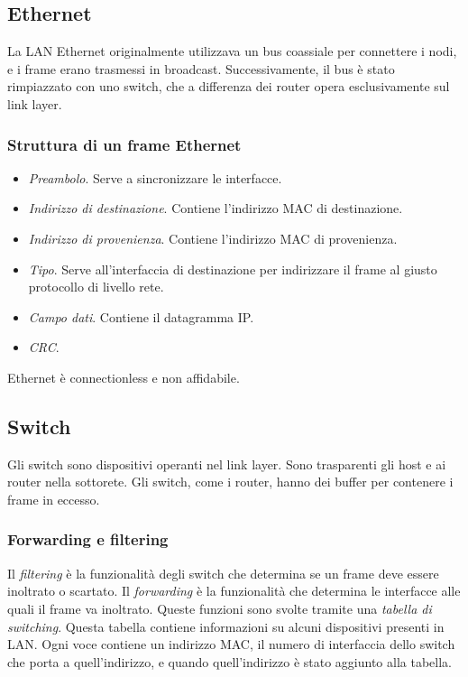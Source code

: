 \documentclass[11pt]{book}
\begin{document}
\subsection{Ethernet}
La LAN Ethernet originalmente utilizzava un bus coassiale per connettere i nodi, e i frame erano trasmessi in broadcast.
Successivamente, il bus è stato rimpiazzato con uno switch, che a differenza dei router opera esclusivamente sul link layer.
\subsubsection{Struttura di un frame Ethernet} 
\begin{itemize}
    \item \textit{Preambolo}. Serve a sincronizzare le interfacce.
    \item \textit{Indirizzo di destinazione}. Contiene l'indirizzo MAC di destinazione.
    \item \textit{Indirizzo di provenienza}. Contiene l'indirizzo MAC di provenienza.
    \item \textit{Tipo}. Serve all'interfaccia di destinazione per indirizzare il frame al giusto protocollo di livello rete.
    \item \textit{Campo dati}. Contiene il datagramma IP.
    \item \textit{CRC}.
\end{itemize}
Ethernet è connectionless e non affidabile. 
\subsection{Switch}
Gli switch sono dispositivi operanti nel link layer. Sono trasparenti gli host e ai router nella sottorete. Gli switch, 
come i router, hanno dei buffer per contenere i frame in eccesso.
\subsubsection{Forwarding e filtering}
Il \textit{filtering} è la funzionalità degli switch che determina se un frame deve essere inoltrato o scartato. Il 
\textit{forwarding} è la funzionalità che determina le interfacce alle quali il frame va inoltrato. Queste funzioni sono 
svolte tramite una \textit{tabella di switching}. Questa tabella contiene informazioni su alcuni dispositivi presenti in 
LAN. Ogni voce contiene un indirizzo MAC, il numero di interfaccia dello switch che porta a quell'indirizzo, e quando 
quell'indirizzo è stato aggiunto alla tabella.
\end{document}
